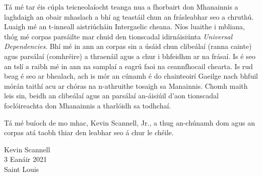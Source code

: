 Tá mé tar éis cúpla teicneolaíocht teanga nua a fhorbairt don Mhanainnis
a laghdaigh an obair mhaslach a bhí ag teastáil chun an frásleabhar
seo a chruthú. Luaigh mé an t-inneall aistriúcháin Intergaelic cheana.
Níos luaithe i mbliana, thóg mé corpas parsáilte mar chuid den 
tionscadal idirnáisiúnta \textit{Universal Dependencies}.
Bhí mé in ann an corpas sin a úsáid chun clibeálaí (ranna cainte) 
agus parsálaí (comhréire) a thraenáil agus a chur i bhfeidhm ar
na frásaí. Is é seo an tslí a raibh mé in ann na samplaí a eagrú faoi na
ceannfhocail chearta.
Is rud beag é seo ar bhealach, ach is mór an cúnamh é do
chainteoirí Gaeilge nach bhfuil mórán taithí acu
ar chóras na n-athruithe tosaigh sa Manainnis.
Chomh maith leis sin, beidh an clibeálaí agus an parsálaí 
an-áisiúil d'aon tionscadal foclóireachta don Mhanainnis
a tharlóidh sa todhchaí.  

Tá mé buíoch de mo mhac, Kevin Scannell, Jr., a thug an-chúnamh dom
agus an corpas atá taobh thiar den leabhar seo á chur le chéile.
\vspace{1.6ex}

\noindent Kevin Scannell\\
3 Eanáir 2021\\
Saint Louis

\endinput
